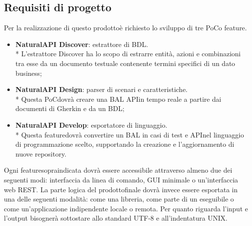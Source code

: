 \subsection{Requisiti di progetto}
Per la realizzazione di questo prodotto\glosp è richiesto lo sviluppo di tre PoC\glosp o feature\glo.
\begin{itemize}
	\item \textbf{NaturalAPI Discover}: estrattore di BDL. \\*
	L'estrattore Discover ha lo scopo di estrarre entità, azioni e combinazioni tra esse da un documento testuale contenente termini specifici di un dato business;
	\item \textbf{NaturalAPI Design}: parser di scenari e caratteristiche. \\*
	Questa PoC\glosp dovrà creare una BAL API\glosp in tempo reale a partire dai documenti di Gherkin e da un BDL;
	\item \textbf{NaturalAPI Develop}: esportatore di linguaggio. \\*
	Questa feature\glosp dovrà convertire un BAL in casi di test e API\glosp nel linguaggio di programmazione scelto, supportando la creazione e l'aggiornamento di nuove repository\glo.
\end{itemize}
Ogni feature\glosp sopraindicata dovrà essere accessibile attraverso almeno due dei seguenti modi: interfaccia da linea di comando, GUI minimale o un'interfaccia web REST\glo. La parte logica del prodotto\glosp finale dovrà invece essere esportata in una delle seguenti modalità: come una libreria, come parte di un eseguibile o come un'applicazione indipendente locale o remota. 
Per quanto riguarda l'input e l'output bisognerà sottostare allo standard UTF-8 e all'indentatura UNIX. 

